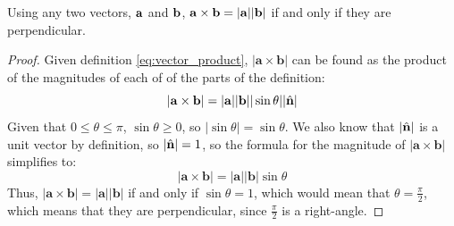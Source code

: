         \begin{theorem}
            Using any two vectors, $\normalfont\mathbf{a}$ and $\normalfont\mathbf{b}$, $\normalfont\mathbf{a}\times\mathbf{b}=|\normalfont\mathbf{a}||\mathbf{b}|$ if and only if they are perpendicular.
        \end{theorem}
        \begin{proof}
            Given definition \ref{eq:vector_product}, $|\mathbf{a}\times\mathbf{b}|$ can be found as the product of the magnitudes of each of of the parts of the definition:
            \begin{equation}
                |\mathbf{a}\times\mathbf{b}|=|\mathbf{a}||\mathbf{b}||\sin\theta||\hat{\mathbf{n}}|
            \end{equation}
            Given that $0\le\theta\le\pi$, $\sin\theta\ge0$, so $|\sin\theta|=\sin\theta$.
            We also know that $|\hat{\mathbf{n}}|$ is a unit vector by definition, so $|\hat{\mathbf{n}}|=1$, so the formula for the magnitude of $|\mathbf{a}\times\mathbf{b}|$ simplifies to:
            \begin{equation}
                |\mathbf{a}\times\mathbf{b}|=|\mathbf{a}||\mathbf{b}|\sin\theta
            \end{equation}
            Thus, $|\mathbf{a}\times\mathbf{b}|=|\mathbf{a}||\mathbf{b}|$ if and only if $\sin\theta=1$, which would mean that $\theta=\frac{\pi}{2}$, which means that they are perpendicular, since $\frac{\pi}{2}$ is a right-angle.
        \end{proof}

